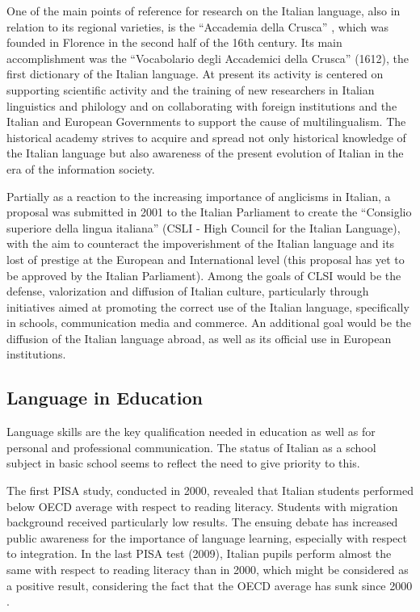\documentclass[]{../../metanetpaper}
\begin{document}
\begin{multicols}{2}
One of the main points of reference for research on the Italian language, also
in relation to its regional varieties, is the “Accademia della Crusca”
\cite{Crusca}, which was founded in Florence in the second half of the 16th
century. Its main accomplishment was the “Vocabolario degli Accademici della
Crusca” (1612), the first dictionary of the Italian language. At present its
activity is centered on supporting scientific activity and the training of new
researchers in Italian linguistics and philology and on collaborating with
foreign institutions and the Italian and European Governments to support the
cause of multilingualism. The historical academy strives to acquire and spread
not only historical knowledge of the Italian language but also awareness of
the present evolution of Italian in the era of the information society.




Partially as a reaction to the increasing importance of anglicisms in Italian,
a proposal was submitted in 2001 to the Italian Parliament to create the
“Consiglio superiore della lingua italiana” (CSLI - High Council for the
Italian Language), with the aim to counteract the impoverishment of the
Italian language and its lost of prestige at the European and International
level (this proposal has yet to be approved by the Italian Parliament). Among
the goals of CLSI would be the defense, valorization and diffusion of Italian
culture, particularly through initiatives aimed at promoting the correct use
of the Italian language, specifically in schools, communication media and
commerce. An additional goal would be the diffusion of the Italian language
abroad, as well as its official use in European institutions.





\subsection{Language in Education}


Language skills are the key qualification needed in education as well as for
personal and professional communication. The status of Italian as a school
subject in basic school seems to reflect the need to give priority to this. 


The first PISA study, conducted in 2000, revealed that Italian students
performed below OECD average with respect to reading literacy. Students with
migration background received particularly low results. The ensuing debate has
increased public awareness for the importance of language learning, especially
with respect to integration. In the last PISA test (2009), Italian pupils
perform almost the same with respect to reading literacy than in 2000, which
might be considered as a positive result, considering the fact that the OECD
average has sunk since 2000 \cite{Pisa1}. 




\end{multicols}
\end{document}
